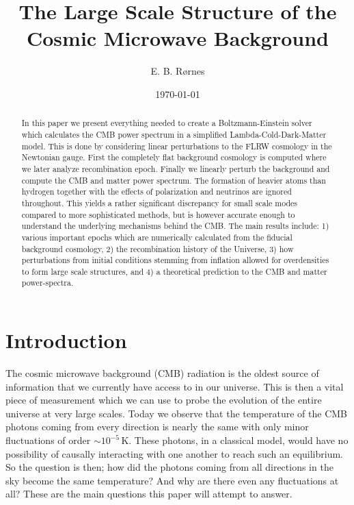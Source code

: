 \documentclass[%
reprint,
 amsmath,amssymb,
 aps,
]{revtex4-2}
\begin{document}
\title{The Large Scale Structure of the Cosmic Microwave Background}

\author{E. B. Rørnes}

\date{\today}

\begin{abstract}
In this paper we present everything needed to create a Boltzmann-Einstein solver which calculates the CMB power spectrum in a simplified Lambda-Cold-Dark-Matter model. This is done by considering linear perturbations to the FLRW cosmology in the Newtonian gauge. First the completely flat background cosmology is computed where we later analyze recombination epoch. Finally we linearly perturb the background and compute the CMB and matter power spectrum. The formation of heavier atoms than hydrogen together with the effects of polarization and neutrinos are ignored throughout. This yields a rather significant discrepancy for small scale modes compared to more sophisticated methods, but is however accurate enough to understand the underlying mechanisms behind the CMB. The main results include: 1) various important epochs which are numerically calculated from the fiducial background cosmology, 2) the recombination history of the Universe, 3) how perturbations from initial conditions stemming from inflation allowed for overdensities to form large scale structures, and 4) a theoretical prediction to the CMB and matter power-spectra.
\end{abstract}

\maketitle

\tableofcontents
\newpage
\section*{Introduction}
The cosmic microwave background (CMB) radiation is the oldest source of information that we currently have access to in our universe. This is then a vital piece of measurement which we can use to probe the evolution of the entire universe at very large scales. Today we observe that the temperature of the CMB photons coming from every direction is nearly the same with only minor fluctuations of order $\sim10^{-5}\,$K. These photons, in a classical model, would have no possibility of causally interacting with one another to reach such an equilibrium. So the question is then; how did the photons coming from all directions in the sky become the same temperature? And why are there even any fluctuations at all? These are the main questions this paper will attempt to answer.
\end{document}
